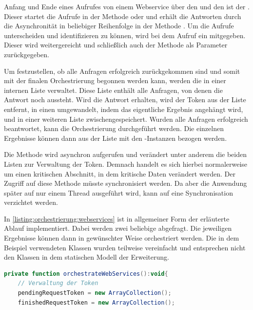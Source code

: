 \begin{onehalfspacing}
Anfang und Ende eines Aufrufes von einem Webservice über den  und den  ist der . Dieser startet die Aufrufe in der Methode  oder  und erhält die Antworten durch die Asynchronität in beliebiger Reihenfolge in der Methode . Um die Aufrufe unterscheiden und identifizieren zu können, wird bei dem Aufruf ein  mitgegeben. Dieser wird weitergereicht und schließlich auch der Methode  als Parameter zurückgegeben.

Um festzustellen, ob alle Anfragen erfolgreich zurückgekommen sind und somit mit der finalen Orchestrierung begonnen werden kann, werden die  in einer internen Liste verwaltet. Diese Liste enthält alle Anfragen, von denen die Antwort noch aussteht.  Wird die Antwort erhalten, wird der Token aus der Liste entfernt, in einen  umgewandelt, indem das eigentliche Ergebnis angehängt wird, und in einer weiteren Liste zwischengespeichert. Wurden alle Anfragen erfolgreich beantwortet, kann die Orchestrierung durchgeführt werden. Die einzelnen Ergebnisse können dann aus der Liste mit den -Instanzen bezogen werden.

Die Methode  wird asynchron aufgerufen und verändert unter anderem die beiden Listen zur Verwaltung der Token. Demnach handelt es sich hierbei normalerweise um einen kritischen Abschnitt, in dem kritische Daten verändert werden. Der Zugriff auf diese Methode müsste synchronisiert werden. Da aber die Anwendung später auf nur einem Thread ausgeführt wird, kann auf eine Synchronisation verzichtet werden.

In \vref{listing:orchestrierung:webservices} ist in allgemeiner Form der erläuterte Ablauf implementiert. Dabei werden zwei beliebige  abgefragt. Die jeweiligen Ergebnisse können dann in gewünschter Weise orchestriert werden. Die in dem Beispiel verwendeten Klassen wurden teilweise vereinfacht und entsprechen nicht den Klassen in dem statischen Modell der Erweiterung.

\begin{programm}[h]
\begin{lstlisting}[language=ActionScript]
private function orchestrateWebServices():void{
	// Verwaltung der Token
	pendingRequestToken = new ArrayCollection();
	finishedRequestToken = new ArrayCollection();
	

\end{lstlisting}
\end{programm}
\end{onehalfspacing}
